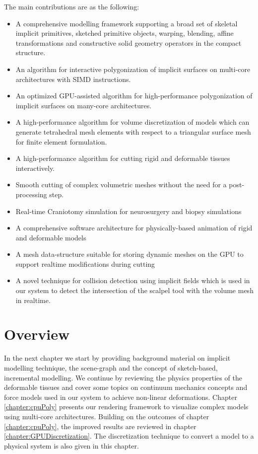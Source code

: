 The main contributions are as the following:

\begin{itemize}
 \item A comprehensive modelling framework supporting a broad set of skeletal implicit primitives, sketched primitive objects, warping, blending, 
 affine transformations and constructive solid geometry operators in the compact \blob structure.
 \item An algorithm for interactive polygonization of implicit surfaces on multi-core architectures with SIMD instructions.
 \item An optimized GPU-assisted algorithm for high-performance polygonization of implicit surfaces on many-core architectures.
 \item A high-performance algorithm for volume discretization of \blob models which can generate tetrahedral mesh elements with respect to a triangular 
 surface mesh for finite element formulation.
 \item A high-performance algorithm for cutting rigid and deformable tissues interactively.
 \item Smooth cutting of complex volumetric meshes without the need for a post-processing step.
 \item Real-time Craniotomy simulation for neurosurgery and biopsy simulations
 \item A comprehensive software architecture for physically-based animation of rigid and deformable models 
 \item A mesh data-structure suitable for storing dynamic meshes on the GPU to 
 support realtime modifications during cutting
 \item A novel technique for collision detection using implicit fields which is 
 used in our system to detect the intersection of the scalpel tool with the volume mesh in realtime. 
 
\end{itemize}


\section{Overview}
In the next chapter we start by providing background material on implicit modelling technique, the \blob scene-graph and the concept of sketch-based, incremental modelling.
We continue by reviewing the physics properties of the deformable tissues and cover some topics on continuum mechanics concepts and force models used in
our system to achieve non-linear deformations. Chapter \ref{chapter:cpuPoly} presents our rendering framework to visualize complex \blob models using multi-core 
architectures. Building on the outcomes of chapter \ref{chapter:cpuPoly}, the improved results are reviewed in chapter \ref{chapter:GPUDiscretization}. 
The discretization technique to convert a \blob model to a physical system is also given in this chapter. 

